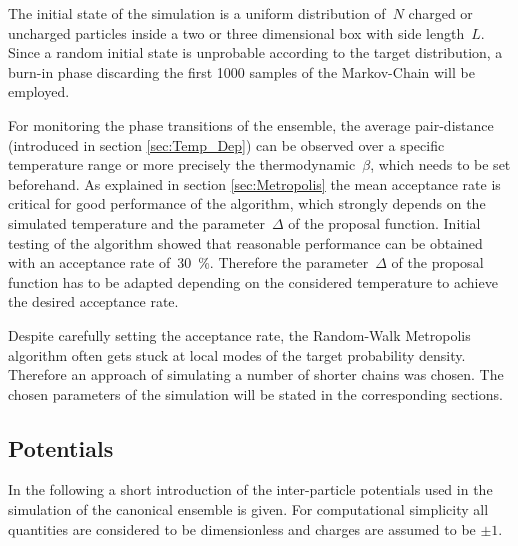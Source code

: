 \documentclass[11pt, a4paper]{article}
\numberwithin{equation}{section}
\begin{document}
The initial state of the simulation is a uniform distribution of~$N$ charged or uncharged particles inside a two or three dimensional box with side length~$L$.
Since a random initial state is unprobable according to the target distribution, a burn-in phase discarding the first 1000 samples of the Markov-Chain will be employed.

For monitoring the phase transitions of the ensemble, the average pair-distance (introduced in section \ref{sec:Temp_Dep}) can be observed over a specific temperature range or more precisely the thermodynamic~$\beta$, which needs to be set beforehand.
As explained in section \ref{sec:Metropolis} the mean acceptance rate is critical for good performance of the algorithm, which strongly depends on the simulated temperature and the parameter~$\Delta$ of the proposal function.
Initial testing of the algorithm showed that reasonable performance can be obtained with an acceptance rate of~\SI{30}{\percent}.
Therefore the parameter~$\Delta$ of the proposal function has to be adapted depending on the considered temperature to achieve the desired acceptance rate.

Despite carefully setting the acceptance rate, the Random-Walk Metropolis algorithm often gets stuck at local modes of the target probability density.
Therefore an approach of simulating a number of shorter chains was chosen.
The chosen parameters of the simulation will be stated in the corresponding sections.

\subsection{Potentials} \label{sec:Potentials}
In the following a short introduction of the inter-particle potentials used in the simulation of the canonical ensemble is given.
For computational simplicity all quantities are considered to be dimensionless and charges are assumed to be $\pm 1$.
\end{document}
